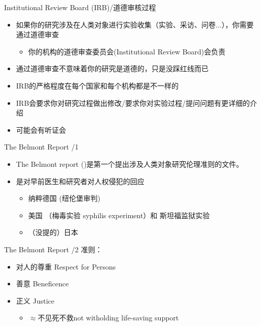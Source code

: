 \documentclass{beamer}
\begin{document}
\begin{frame}{Institutional Review Board (IRB)/道德审核过程}
\begin{itemize}
    \item 如果你的研究涉及在人类对象进行实验收集（实验、采访、问卷...），你需要通过道德审查
    \begin{itemize}
        \item 你的机构的道德审查委员会(Institutional Review Board)会负责
    \end{itemize}
    \item 通过道德审查\alert{不意味着}你的研究是道德的，只是没踩红线而已
    \item IRB的严格程度在每个国家和每个机构都是不一样的
    \item IRB会要求你对研究过程做出修改/要求你对实验过程/提问问题有更详细的介绍
    \item 可能会有听证会
\end{itemize}
\end{frame}

\begin{frame}{The Belmont Report /1}
\begin{itemize}
    \item The Belmont report (\citeyear{Belmont1979})是第一个提出涉及人类对象研究伦理准则的文件。
    \item 是对早前医生和研究者对人权侵犯的回应
    \begin{itemize}
        \item 纳粹德国  (纽伦堡审判)
        \item 美国 （梅毒实验 syphilis experiment）和 斯坦福监狱实验
        \item （没提的）日本
    \end{itemize}
\end{itemize}
\end{frame}

\begin{frame}{The Belmont Report /2}
准则：
\begin{itemize}
    \item 对人的尊重 Respect for Persons
    \item 善意 Beneficence
    \item 正义 Justice
    \begin{itemize}
        \item $\approx$不见死不救not witholding life-saving support
    \end{itemize}
\end{itemize}
\end{frame}
\end{document}
